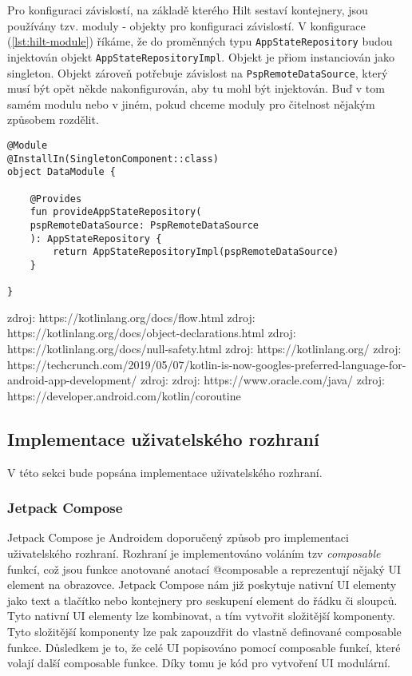 \noindent Pro konfiguraci závislostí, na základě kterého Hilt sestaví kontejnery, jsou používány tzv. moduly - objekty pro konfiguraci závislostí. V konfigurace (\ref{lst:hilt-module}) říkáme, že do proměnných typu \lstinline|AppStateRepository| budou injektován objekt \lstinline|AppStateRepositoryImpl|. Objekt je přiom instanciován jako singleton. Objekt zároveň potřebuje závislost na \lstinline|PspRemoteDataSource|, který musí být opět někde nakonfigurován, aby tu mohl být injektován. Buď v tom samém modulu nebo v jiném, pokud chceme moduly pro čitelnost nějakým způsobem rozdělit.

\begin{lstlisting}[caption={Příklad konfigurace závislostí pro Hilt}, label={lst:hilt-module}, tabsize=2]
@Module
@InstallIn(SingletonComponent::class)
object DataModule {
	
	@Provides
	fun provideAppStateRepository(
	pspRemoteDataSource: PspRemoteDataSource
	): AppStateRepository {
		return AppStateRepositoryImpl(pspRemoteDataSource)
	}

}
\end{lstlisting}
	
zdroj: https://kotlinlang.org/docs/flow.html
zdroj: https://kotlinlang.org/docs/object-declarations.html
zdroj: https://kotlinlang.org/docs/null-safety.html
zdroj: https://kotlinlang.org/
zdroj: https://techcrunch.com/2019/05/07/kotlin-is-now-googles-preferred-language-for-android-app-development/
zdroj: zdroj: https://www.oracle.com/java/
zdroj: https://developer.android.com/kotlin/coroutine

\subsection {Implementace uživatelského rozhraní}
V této sekci bude popsána implementace uživatelského rozhraní.

\subsubsection*{Jetpack Compose}
\label{sssec:jetpack-compose}
Jetpack Compose je Androidem doporučený způsob pro implementaci uživatelského rozhraní. Rozhraní je implementováno voláním tzv \textit{composable} funkcí, což jsou funkce anotované anotací @composable a reprezentují nějaký UI element na obrazovce. Jetpack Compose nám již poskytuje nativní UI elementy jako text a tlačítko nebo kontejnery pro seskupení element do řádku či sloupců. Tyto nativní UI elementy lze kombinovat, a tím vytvořit složitější komponenty. Tyto složitější komponenty lze pak zapouzdřit do vlastně definované composable funkce. Důsledkem je to, že celé UI popisováno pomocí composable funkcí, které volají další composable funkce. Díky tomu je kód pro vytvoření UI modulární. 

